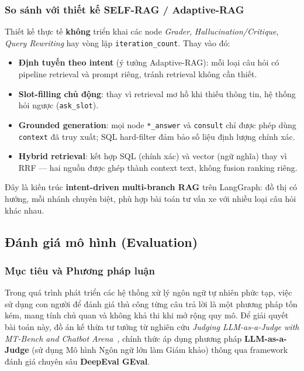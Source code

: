 \subsubsection{So sánh với thiết kế SELF-RAG / Adaptive-RAG}

Thiết kế thực tế \textbf{không} triển khai các node \textit{Grader}, \textit{Hallucination/Critique}, \textit{Query Rewriting} hay vòng lặp \texttt{iteration\_count}. Thay vào đó:

\begin{itemize}
    \item \textbf{Định tuyến theo intent} (ý tưởng Adaptive-RAG): mỗi loại câu hỏi có pipeline retrieval và prompt riêng, tránh retrieval không cần thiết.
    \item \textbf{Slot-filling chủ động}: thay vì retrieval mơ hồ khi thiếu thông tin, hệ thống hỏi ngược (\texttt{ask\_slot}).
    \item \textbf{Grounded generation}: mọi node \texttt{*\_answer} và \texttt{consult} chỉ được phép dùng \texttt{context} đã truy xuất; SQL hard-filter đảm bảo số liệu định lượng chính xác.
    \item \textbf{Hybrid retrieval}: kết hợp SQL (chính xác) và vector (ngữ nghĩa) thay vì RRF --- hai nguồn được ghép thành context text, không fusion ranking riêng.
\end{itemize}

Đây là kiến trúc \textbf{intent-driven multi-branch RAG} trên LangGraph: đồ thị có hướng, mỗi nhánh chuyên biệt, phù hợp bài toán tư vấn xe với nhiều loại câu hỏi khác nhau.
\subsection{Đánh giá mô hình (Evaluation)}

\subsubsection{Mục tiêu và Phương pháp luận}

Trong quá trình phát triển các hệ thống xử lý ngôn ngữ tự nhiên phức tạp, việc sử dụng con người để đánh giá thủ công từng câu trả lời là một phương pháp tốn kém, mang tính chủ quan và không khả thi khi mở rộng quy mô. Để giải quyết bài toán này, đồ án kế thừa tư tưởng từ nghiên cứu \textit{Judging LLM-as-a-Judge with MT-Bench and Chatbot Arena}~\cite{zheng2023llmjudge}, chính thức áp dụng phương pháp \textbf{LLM-as-a-Judge} (sử dụng Mô hình Ngôn ngữ lớn làm Giám khảo) thông qua framework đánh giá chuyên sâu \textbf{DeepEval GEval}. 

